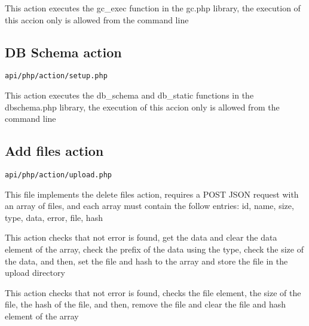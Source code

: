 \documentclass[a4paper]{article}
\begin{document}
This action executes the gc\_exec function in the gc.php library, the execution
of this accion only is allowed from the command line

\hypertarget{toc11}{}
\subsection{DB Schema action}

\begin{lstlisting}
api/php/action/setup.php
\end{lstlisting}

This action executes the db\_schema and db\_static functions in the dbschema.php
library, the execution of this accion only is allowed from the command line

\hypertarget{toc12}{}
\subsection{Add files action}

\begin{lstlisting}
api/php/action/upload.php
\end{lstlisting}

This file implements the delete files action, requires a POST JSON request
with an array of files, and each array must contain the follow entries:
id, name, size, type, data, error, file, hash

This action checks that not error is found, get the data and clear the
data element of the array, check the prefix of the data using the type,
check the size of the data, and then, set the file and hash to the
array and store the file in the upload directory

This action checks that not error is found, checks the file element, the
size of the file, the hash of the file, and then, remove the file and
clear the file and hash element of the array
\end{document}
